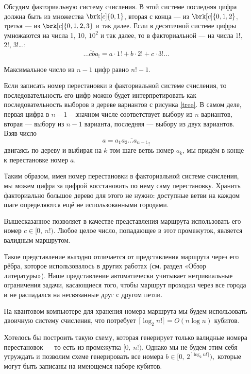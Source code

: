
Обсудим факториальную систему счисления. В этой системе последняя цифра должна быть из множества $\brk[c]{0, 1}$, вторая с конца --- из $\brk[c]{0, 1, 2}$, третья --- из $\brk[c]{0, 1, 2, 3}$ и так далее. Если в десятичной системе цифры умножаются на числа 1, 10, $10^2$ и так далее, то в факториальной --- на числа 1!, 2!, $3!$\dots:
$$
\overline{\dots cba}_! = a \cdot 1! + b \cdot 2! + c \cdot 3! \dots
$$

Максимальное число из $n-1$ цифр равно $n!-1$. 
 
Если записать номер перестановки в факториальной системе счисления, то последовательность его цифр можно будет интерпретировать как последовательность выборов в дереве вариантов с рисунка \ref{tree}. 
В самом деле, первая цифра в $n{-}1{-}$значном числе соответствует выбору из $n$ вариантов, вторая --- выбору из $n-1$ варианта, последняя --- выбору из двух вариантов. 
Взяв число 
$$a = \overline{a_1 a_2 \dots a_{n-1}}_!$$ 
двигаясь по дереву и выбирая на $k$-том шаге ветвь номер $a_k$, мы придём в конце к перестановке номер $a$.

Таким образом, имея номер перестановки в факториальной системе счисления, мы можем цифра за цифрой восстановить по нему саму перестановку. Хранить факториально большое дерево для этого не нужно: доступные ветви на каждом шаге определяются ещё не использованными городами.



Вышесказанное позволяет в качестве представления маршрута использовать его номер $c \in [0,\: n!)$. Любое целое число, попадающее в этот промежуток, является валидным маршрутом.

Такое представление выгодно отличается от представления маршрута через его рёбра, которое использовалось в других работах (см. раздел «Обзор литературы»). Наше представление автоматически учитывает нетривиальные ограничения задачи, касающиеся того, чтобы маршрут проходил через все города и не распадался на несвязанные друг с другом петли.

На квантовом компьютере для хранения номера маршрута мы будем использовать двоичную систему счисления, что потребует $\lceil \log_2 n! \rceil = O(n \log n)$ кубитов. 

Хотелось бы построить такую схему, которая генерирует только валидные номера перестановок --- то есть из промежутка $[0,\: n!)$. Однако мы не будем этим себя утруждать и позволим схеме генерировать все номера $b \in [0,\: 2^{\lceil \log_2 n! \rceil}),$ которые могут быть записаны на имеющемся наборе кубитов.

